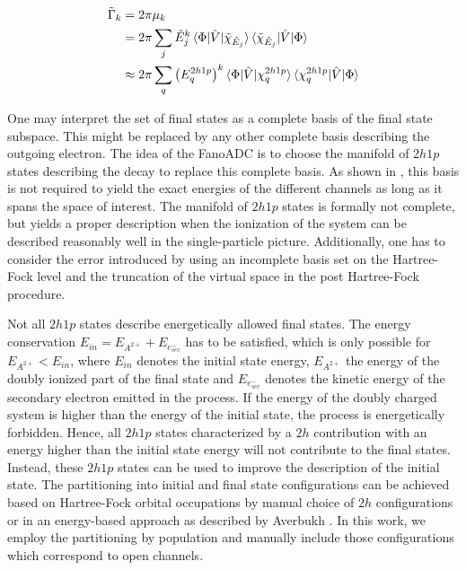 \begin{align}
  \tilde{\Gamma}_k &= 2\pi \mu_k \\
         &= 2\pi \sum_j \tilde{E}_j^k
            \braket{\Phi|\hat{V}|\tilde{\chi}_{\tilde{E}_j}}
            \braket{\tilde{\chi}_{\tilde{E}_j}|\hat{V}|\Phi} \\           
         &\approx 2\pi \sum_q \left( E^{2h1p}_q\right) ^k
            \braket{\Phi|\hat{V}|\chi^{2h1p}_q}
            \braket{\chi^{2h1p}_q|\hat{V}|\Phi}
\end{align}

One may interpret the set of final states as a complete basis
of the final state subspace.
This might be replaced by any other complete basis
describing the outgoing electron. The idea of the FanoADC is to choose
the manifold of $2h1p$ states describing the decay to replace this
complete basis.
As shown in \cite{Averbukh05}, this basis is not required to yield the
exact energies of the different channels as long as it spans the space
of interest.
The manifold of $2h1p$ states is formally not complete, but
yields a proper description when the ionization of the system can be
described reasonably well in the single-particle picture.
Additionally, one has to consider the error introduced
by using an incomplete basis set on the Hartree-Fock level and the truncation
of the virtual space in the post Hartree-Fock procedure.

Not all $2h1p$ states describe energetically allowed final states.
The energy conservation $E_{in} = E_{A^{2+}} + E_{e^-_{sec}}$ has
to be satisfied, which is only possible for $E_{A^{2+}} < E_{in}$, where
$E_{in}$ denotes the initial state energy, $E_{A^{2+}}$ the energy of the
doubly ionized part of the final state and $E_{e^-_{sec}}$ denotes the
kinetic energy of the secondary electron emitted in the process.
If the energy of
the doubly charged system is higher than the energy of the initial state, the
process is energetically forbidden. Hence, all $2h1p$ states characterized by
a $2h$ contribution with an energy higher than the initial state energy will
not contribute to the final states.
Instead, these $2h1p$ states can be used to improve the description of
the initial state.
The partitioning into initial and final state configurations can be
achieved based on Hartree-Fock orbital occupations by manual choice of $2h$
configurations
or in an energy-based approach as described by Averbukh
\cite{Averbukh05}.
In this work, we employ the partitioning by population and manually include
those configurations which correspond to open channels.

